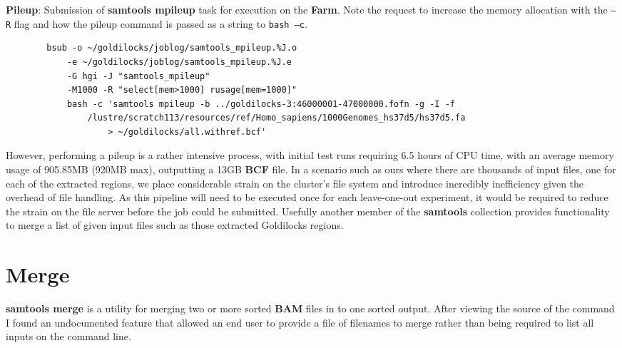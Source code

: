 \begin{listing}[H]
    \caption[syn-mpileup]{\textbf{Pileup}: Submission of
        \textbf{samtools mpileup}\citep{samtools-mpileup} task
        for execution on the \textbf{Farm}. Note the request to increase the
        memory allocation with the \texttt{--R} flag and how the pileup command
        is passed as a string to \texttt{bash --c}.}
    \label{list:syn-mpileup}
    \begin{verbatim}
        bsub -o ~/goldilocks/joblog/samtools_mpileup.%J.o
            -e ~/goldilocks/joblog/samtools_mpileup.%J.e
            -G hgi -J "samtools_mpileup"
            -M1000 -R "select[mem>1000] rusage[mem=1000]"
            bash -c 'samtools mpileup -b ../goldilocks-3:46000001-47000000.fofn -g -I -f
                /lustre/scratch113/resources/ref/Homo_sapiens/1000Genomes_hs37d5/hs37d5.fa
                    > ~/goldilocks/all.withref.bcf'
    \end{verbatim}
\end{listing}

However, performing a pileup is a rather intensive process, with initial test
runs requiring 6.5 hours of CPU time, with an average memory usage of 905.85MB
(920MB max), outputting a 13GB \textbf{BCF} file. In a scenario such as ours
where there are thousands of input files, one for each of the extracted regions,
we place considerable strain on the cluster's file system and introduce
incredibly inefficiency given the overhead of file handling.  As this pipeline
will need to be executed once for each leave-one-out experiment, it would be
required to reduce the strain on the file server before the job could be
submitted. Usefully another member of the \textbf{samtools} collection provides
functionality to merge a list of given input files such as those extracted
Goldilocks regions.



\section{Merge}

\textbf{samtools merge}\citep{man:samtools} is a utility for merging two or more
sorted \textbf{BAM} files in to one sorted output. After viewing the source of
the command I found an undocumented feature that allowed an end user to provide
a file of filenames to merge rather than being required to list all inputs on
the command line.

